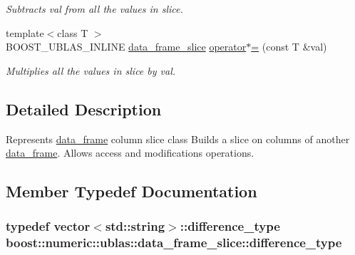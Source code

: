 \begin{DoxyCompactItemize}
\begin{DoxyCompactList}\small\item\em Subtracts {\ttfamily val} from all the values in slice. \end{DoxyCompactList}\item 
{\footnotesize template$<$class T $>$ }\\B\+O\+O\+S\+T\+\_\+\+U\+B\+L\+A\+S\+\_\+\+I\+N\+L\+I\+NE \hyperlink{classboost_1_1numeric_1_1ublas_1_1data__frame__slice}{data\+\_\+frame\+\_\+slice} \hyperlink{classboost_1_1numeric_1_1ublas_1_1data__frame__slice_ae0973493074b3a4d855b3a742d7980d3}{operator$\ast$=} (const T \&val)
\begin{DoxyCompactList}\small\item\em Multiplies all the values in slice by {\ttfamily val}. \end{DoxyCompactList}\end{DoxyCompactItemize}


\subsection{Detailed Description}
Represents \hyperlink{classboost_1_1numeric_1_1ublas_1_1data__frame}{data\+\_\+frame} column slice class Builds a slice on columns of another \hyperlink{classboost_1_1numeric_1_1ublas_1_1data__frame}{data\+\_\+frame}. Allows access and modifications operations. 

\subsection{Member Typedef Documentation}
\subsubsection[{\texorpdfstring{difference\+\_\+type}{difference_type}}]{\setlength{\rightskip}{0pt plus 5cm}typedef vector$<$std\+::string$>$\+::{\bf difference\+\_\+type} {\bf boost\+::numeric\+::ublas\+::data\+\_\+frame\+\_\+slice\+::difference\+\_\+type}}\hypertarget{classboost_1_1numeric_1_1ublas_1_1data__frame__slice_ab8da22e0f4069692d24bc0269f7d8281}{}\label{classboost_1_1numeric_1_1ublas_1_1data__frame__slice_ab8da22e0f4069692d24bc0269f7d8281}
